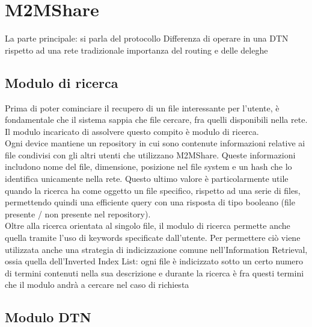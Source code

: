 
\chapter{M2MShare}\label{m2mshare} %





La parte principale: si parla del protocollo
Differenza di operare in una DTN rispetto ad una rete tradizionale
importanza del routing e delle deleghe


\section{Modulo di ricerca}
Prima di poter cominciare il recupero di un file interessante per l'utente, è fondamentale che il sistema sappia che file cercare, fra quelli disponibili nella rete. Il modulo incaricato di assolvere questo compito è modulo di ricerca.
\\

Ogni device mantiene un repository in cui sono contenute informazioni relative ai file condivisi con gli altri utenti che utilizzano M2MShare. Queste informazioni includono nome del file, dimensione, posizione nel file system e un hash che lo identifica unicamente nella rete. Questo ultimo valore è particolarmente utile quando la ricerca ha come oggetto un file specifico, rispetto ad una serie di files, permettendo quindi una efficiente query con una risposta di tipo booleano (file presente / non presente nel repository).
\\
Oltre alla ricerca orientata al singolo file, il modulo di ricerca permette anche quella tramite l'uso di keywords specificate dall'utente. Per permettere ciò viene utilizzata anche una strategia di indicizzazione comune nell'Information Retrieval, ossia quella dell'Inverted Index List: ogni file è indicizzato sotto un certo numero di termini contenuti nella sua descrizione e durante la ricerca è fra questi termini che il modulo andrà a cercare nel caso di richiesta

\section{Modulo DTN}

